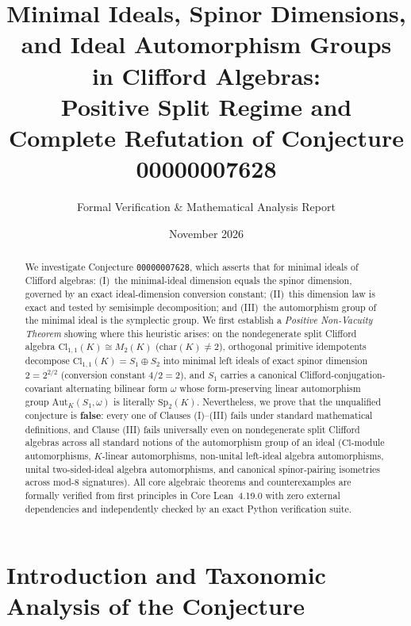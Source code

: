 \documentclass[11pt,a4paper]{article}
\title{\textbf{Minimal Ideals, Spinor Dimensions, and Ideal Automorphism Groups in Clifford Algebras:\\[4pt]
\large Positive Split Regime and Complete Refutation of Conjecture 00000007628}}
\author{Formal Verification \& Mathematical Analysis Report}
\date{November 2026}
\theoremstyle{definition}
\newcommand{\Cl}{\mathrm{Cl}}
\newcommand{\Aut}{\mathrm{Aut}}
\newcommand{\Sp}{\mathrm{Sp}}
\begin{document}
\maketitle

\begin{abstract}
We investigate Conjecture \texttt{00000007628}, which asserts that for minimal ideals of Clifford algebras: (I)~the minimal-ideal dimension equals the spinor dimension, governed by an exact ideal-dimension conversion constant; (II)~this dimension law is exact and tested by semisimple decomposition; and (III)~the automorphism group of the minimal ideal is the symplectic group. We first establish a \emph{Positive Non-Vacuity Theorem} showing where this heuristic arises: on the nondegenerate split Clifford algebra $\Cl_{1,1}(K) \cong M_2(K)$ ($\mathrm{char}(K) \neq 2$), orthogonal primitive idempotents decompose $\Cl_{1,1}(K) = S_1 \oplus S_2$ into minimal left ideals of exact spinor dimension $2 = 2^{2/2}$ (conversion constant $4/2 = 2$), and $S_1$ carries a canonical Clifford-conjugation-covariant alternating bilinear form $\omega$ whose form-preserving linear automorphism group $\Aut_K(S_1, \omega)$ is literally $\Sp_2(K)$. Nevertheless, we prove that the unqualified conjecture is \textbf{false}: every one of Clauses (I)--(III) fails under standard mathematical definitions, and Clause (III) fails universally even on nondegenerate split Clifford algebras across all standard notions of the automorphism group of an ideal ($\Cl$-module automorphisms, $K$-linear automorphisms, non-unital left-ideal algebra automorphisms, unital two-sided-ideal algebra automorphisms, and canonical spinor-pairing isometries across mod-$8$ signatures). All core algebraic theorems and counterexamples are formally verified from first principles in Core Lean~4.19.0 with zero external dependencies and independently checked by an exact Python verification suite.
\end{abstract}

\section{Introduction and Taxonomic Analysis of the Conjecture}
\end{document}
